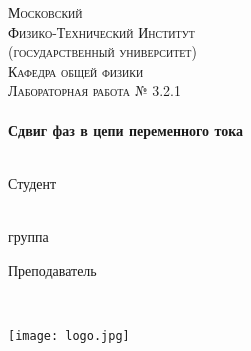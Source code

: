 \begin{titlepage}
\center %
 

\textsc{\LARGE Московский\\[-0.2cm]Физико-Технический Институт\\[0.1cm]\large (государственный университет)}\\[1.5cm] %
\textsc{\Large Кафедра общей физики}\\[0.1cm] %
\textsc{\large Лабораторная работа № 3.2.1}\\[0.5cm] %


\HRule
\\[0.6cm]
{ \huge \bfseries Сдвиг фаз в цепи переменного тока}
\\[0.3cm] %
\HRule
\\[1.5cm]


 

\begin{minipage}[t]{0.48\textwidth}
	\begin{flushleft} \large
		\textsf{Студент}\bigskip
		
		  \\[5mm]
		\underline{\hspace{30mm}} группа
	\end{flushleft}
\end{minipage}
\hfill
\begin{minipage}[t]{0.48\textwidth}
	\begin{flushright} \large
		\textsf{Преподаватель}\bigskip
		
		  \\[5mm]
	\end{flushright}
\end{minipage}

\begin{bottompar}
	\begin{center}
		\texttt{[image: logo.jpg]}
	\end{center}

\end{bottompar}
\vfill %

\end{titlepage}